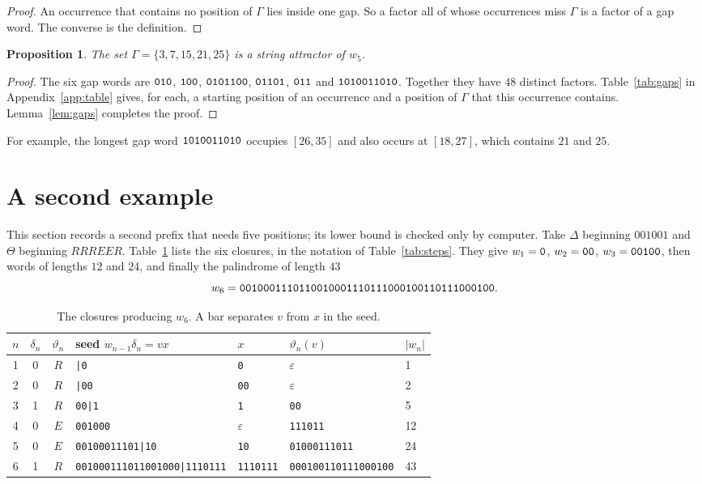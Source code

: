 \documentclass[11pt]{article}
\newtheorem{proposition}[theorem]{Proposition}
\theoremstyle{remark}
\newcommand{\w}[1]{\textup{\texttt{#1}}}
\begin{document}
\begin{proof}
An occurrence that contains no position of $\Gamma$ lies inside one gap. So a
factor all of whose occurrences miss $\Gamma$ is a factor of a gap word. The
converse is the definition.
\end{proof}

\begin{proposition}\label{prop:upper}
The set $\Gamma=\{3,7,15,21,25\}$ is a string attractor of $w_5$.
\end{proposition}

\begin{proof}
The six gap words are $\w{010}$, $\w{100}$, $\w{0101100}$, $\w{01101}$,
$\w{011}$ and $\w{1010011010}$. Together they have $48$ distinct factors.
Table~\ref{tab:gaps} in Appendix~\ref{app:table} gives, for each, a starting
position of an occurrence and a position of $\Gamma$ that this occurrence
contains. Lemma~\ref{lem:gaps} completes the proof.
\end{proof}

For example, the longest gap word $\w{1010011010}$ occupies $[26,35]$ and also
occurs at $[18,27]$, which contains $21$ and $25$.

\section{A second example}\label{sec:second}

This section records a second prefix that needs five positions; its lower
bound is checked only by computer. Take $\Delta$ beginning $001001$ and
$\Theta$ beginning $RRREER$. Table~\ref{tab:second} lists the six closures,
in the notation of Table~\ref{tab:steps}. They give $w_1=\w{0}$, $w_2=\w{00}$,
$w_3=\w{00100}$, then words of lengths $12$ and $24$, and finally the
palindrome of length $43$
\[
w_6=\w{0010001110110010001110111000100110111000100}.
\]

\begin{table}[ht]
\centering\small
\begin{tabular}{@{}cccllll@{}}
\toprule
$n$ & $\delta_n$ & $\vartheta_n$ & seed $w_{n-1}\delta_n=vx$ & $x$ & $\vartheta_n(v)$ & $|w_n|$\\
\midrule
1 & 0 & $R$ & \w{|0} & \w{0} & $\varepsilon$ & 1\\
2 & 0 & $R$ & \w{|00} & \w{00} & $\varepsilon$ & 2\\
3 & 1 & $R$ & \w{00|1} & \w{1} & \w{00} & 5\\
4 & 0 & $E$ & \w{001000} & $\varepsilon$ & \w{111011} & 12\\
5 & 0 & $E$ & \w{00100011101|10} & \w{10} & \w{01000111011} & 24\\
6 & 1 & $R$ & \w{001000111011001000|1110111} & \w{1110111} & \w{000100110111000100} & 43\\
\bottomrule
\end{tabular}
\caption{The closures producing $w_6$. A bar separates $v$ from $x$ in the seed.}
\label{tab:second}
\end{table}
\end{document}
